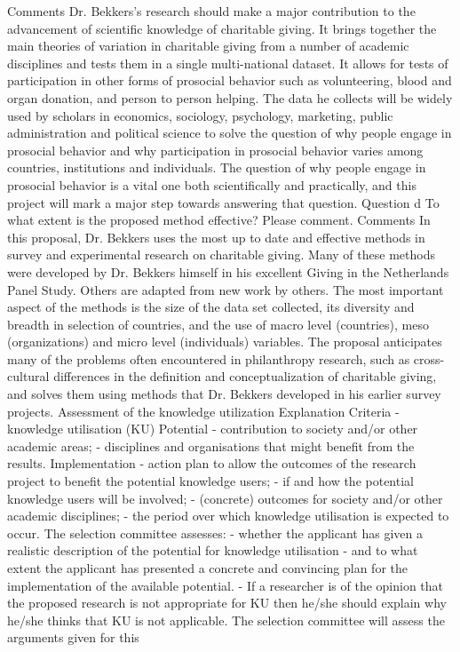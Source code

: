 \documentclass[twocolumn, serif, rga, numeric]{jote-article}
\begin{document}
Comments
Dr. Bekkers's research should make a major contribution to the advancement of scientific knowledge of charitable giving. It brings together the main theories of variation in charitable giving from a number of academic disciplines and tests them in a single multi-national dataset. It allows for tests of participation in other forms of prosocial behavior such as volunteering, blood and organ donation, and person to person helping. The data he collects will be widely used by scholars in economics, sociology, psychology, marketing, public administration and political science to solve the question of why people engage in prosocial behavior and why participation in prosocial behavior varies among countries, institutions and individuals. The question of why people engage in prosocial behavior is a vital one both scientifically and practically, and this project will mark a major step towards answering that question.
Question d
To what extent is the proposed method effective? Please comment.
Comments
In this proposal, Dr. Bekkers uses the most up to date and effective methods in survey and experimental research on charitable giving. Many of these methods were developed by Dr. Bekkers himself in his excellent Giving in the Netherlands Panel Study. Others are adapted from new work by others. The most important aspect of the methods is the size of the data set collected, its diversity and breadth in selection of countries, and the use of macro level (countries), meso (organizations) and micro level (individuals) variables. The proposal anticipates many of the problems often encountered in philanthropy research, such as cross-cultural differences in the definition and conceptualization of charitable giving, and solves them using methods that Dr. Bekkers developed in his earlier survey projects.
Assessment of the knowledge utilization
Explanation
Criteria - knowledge utilisation (KU) Potential - contribution to society and/or other academic areas; - disciplines and organisations that might benefit from the results. Implementation - action plan to allow the outcomes of the research project to benefit the potential knowledge users; - if and how the potential knowledge users will be involved; - (concrete) outcomes for society and/or other academic disciplines; - the period over which knowledge utilisation is expected to occur. The selection committee assesses: - whether the applicant has given a realistic description of the potential for knowledge utilisation - and to what extent the applicant has presented a concrete and convincing plan for the implementation of the available potential. - If a researcher is of the opinion that the proposed research is not appropriate for KU then he/she should explain why he/she thinks that KU is not applicable. The selection committee will assess the arguments given for this
\end{document}
